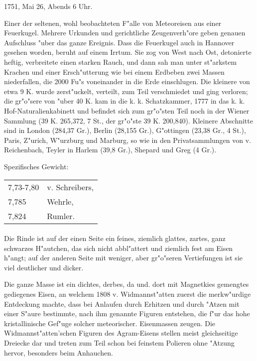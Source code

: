 \documentclass[a4paper, 11pt, oneside]{article}
\begin{document}
1751, Mai 26, Abends 6 Uhr.

Einer der seltenen, wohl beobachteten F"alle von Meteoreisen aus einer Feuerkugel. Mehrere Urkunden und gerichtliche Zeugenverh"ore geben genauen Aufschluss "uber das ganze Ereignis. Dass die Feuerkugel auch in Hannover gesehen worden, beruht auf einem Irrtum. Sie zog von West nach Ost, detonierte heftig, verbreitete einen starken Rauch, und dann sah man unter st"arkstem Krachen und einer Ersch"utterung wie bei einem Erdbeben zwei Massen niederfallen, die 2000 Fu"s voneinander in die Erde einschlugen. Die kleinere von etwa 9 K. wurde zerst"uckelt, verteilt, zum Teil verschmiedet und ging verloren; die gr"o"sere von "uber 40 K. kam in die k. k. Schatzkammer, 1777 in das k. k. Hof-Naturalienkabinett und befindet sich zum gr"o"sten Teil noch in der Wiener Sammlung (39 K. 265,372, 7 St., der gr"o"ste 39 K. 200,840). Kleinere Abschnitte sind in London (284,37 Gr.), Berlin (28,155 Gr.), G"ottingen (23,38 Gr., 4 St.), Paris, Z"urich, W"urzburg und Marburg, so wie in den Privatsammlungen von v. Reichenbach, Teyler in Harlem (39,8 Gr.), Shepard und Greg (4 Gr.).

Spezifisches Gewicht:  
\begin{table}[!ht]
    \centering
    \begin{tabular}{l l}
        7,73-7,80 & v. Schreibers,\\
        7,785 & Wehrle,\\
        7,824 & Rumler.
    \end{tabular}
\end{table}
\paragraph{}
Die Rinde ist auf der einen Seite ein feines, ziemlich glattes, zartes, ganz schwarzes H"autchen, das sich nicht abbl"attert und ziemlich fest am Eisen h"angt; auf der anderen Seite mit weniger, aber gr"o"seren Vertiefungen ist sie viel deutlicher und dicker.

Die ganze Masse ist ein dichtes, derbes, da und. dort mit Magnetkies gemengtes gediegenes Eisen, an welchem 1808 v. Widmannst"atten zuerst die merkw"urdige Entdeckung machte, dass bei Anlaufen durch Erhitzen und durch "Atzen mit einer S"aure bestimmte, nach ihm genannte Figuren entstehen, die f"ur das hohe kristallinische Gef"uge solcher meteorischer. Eisenmassen zeugen. Die Widmannst"atten'schen Figuren des Agram-Eisens stellen meist gleichseitige Dreiecke dar und treten zum Teil schon bei feinstem Polieren ohne "Atzung hervor, besonders beim Anhauchen.
\end{document}
